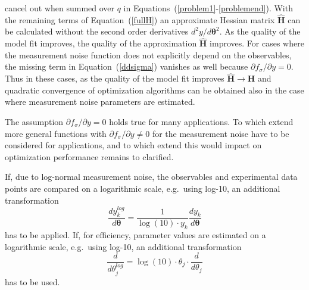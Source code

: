 \documentclass[12pt,a4paper]{scrartcl}
\newcommand{\DD}[2]{\frac{d #1}{d #2}}
\begin{document}
cancel out when summed over $q$ in Equations~(\ref{problem1}-\ref{problemend}). With the remaining 
terms of Equation~(\ref{fullH}) an approximate Hessian matrix $\mathbf{\hat H}$ can be calculated without 
the second order derivatives $d^2 {y}/d \boldsymbol{\theta}^2$. As the quality of the model fit improves, the 
quality of the approximation $\mathbf{\hat H}$ improves. For cases where the measurement noise function 
does not explicitly depend on the observables, the missing term in Equation~(\ref{ddsigma}) vanishes as 
well because $\partial f_\sigma / \partial y= 0$. Thus in these cases, as the quality of the model fit improves 
$\mathbf{\hat H} \rightarrow \mathbf{H}$ and quadratic convergence of optimization algorithms can be 
obtained also in the case where measurement noise parameters are estimated. 

The assumption $\partial f_\sigma / \partial y = 0$ holds true for many applications. To which extend more 
general functions with $\partial f_\sigma / \partial y \not= 0$ for the measurement noise have to be 
considered for applications, and to which extend this would impact on optimization performance remains to 
clarified.

If, due to log-normal measurement noise, the observables and experimental data points are compared on a 
logarithmic scale, e.g.~using log-10, an additional transformation
\begin{equation}
	\DD{y_k^{log}}{\boldsymbol{\theta}} =  \frac{1}{\log(10) \cdot y_k}\DD{y_k}{\boldsymbol{\theta}}
\end{equation}
has to be applied. 
If, for efficiency, parameter values are estimated on a logarithmic scale, e.g.~using log-10, an additional 
transformation
\begin{equation}
	\DD{}{\theta_j^{log}} = \log(10)\cdot \theta_j \cdot \DD{}{\theta_j}
\end{equation}
has to be used. 
\end{document}
